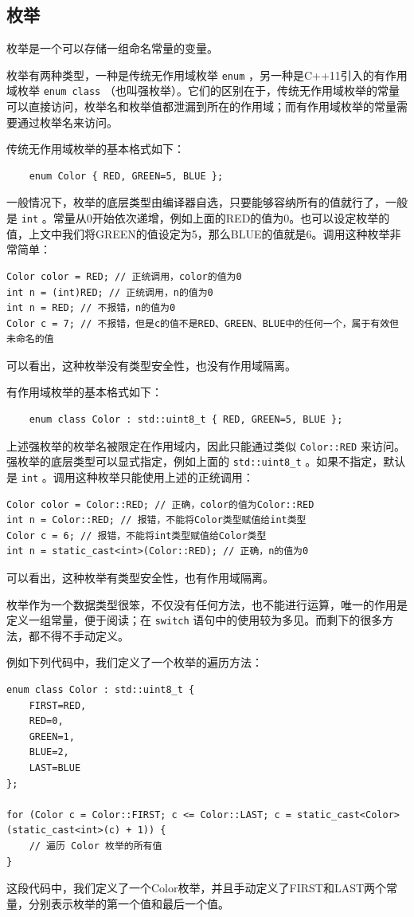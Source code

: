 \subsection{枚举}

枚举是一个可以存储一组命名常量的变量。

枚举有两种类型，一种是传统无作用域枚举 \texttt{enum} ，另一种是C++11引入的有作用域枚举 \texttt{enum class} （也叫强枚举）。它们的区别在于，传统无作用域枚举的常量可以直接访问，枚举名和枚举值都泄漏到所在的作用域；而有作用域枚举的常量需要通过枚举名来访问。

传统无作用域枚举的基本格式如下：
\begin{verbatim}
    enum Color { RED, GREEN=5, BLUE };
\end{verbatim}
一般情况下，枚举的底层类型由编译器自选，只要能够容纳所有的值就行了，一般是 \texttt{int} 。常量从0开始依次递增，例如上面的RED的值为0。也可以设定枚举的值，上文中我们将GREEN的值设定为5，那么BLUE的值就是6。调用这种枚举非常简单：
\begin{verbatim}
Color color = RED; // 正统调用，color的值为0
int n = (int)RED; // 正统调用，n的值为0
int n = RED; // 不报错，n的值为0
Color c = 7; // 不报错，但是c的值不是RED、GREEN、BLUE中的任何一个，属于有效但未命名的值
\end{verbatim}
可以看出，这种枚举没有类型安全性，也没有作用域隔离。

有作用域枚举的基本格式如下：
\begin{verbatim}
    enum class Color : std::uint8_t { RED, GREEN=5, BLUE };
\end{verbatim}
上述强枚举的枚举名被限定在作用域内，因此只能通过类似 \texttt{Color::RED} 来访问。强枚举的底层类型可以显式指定，例如上面的 \texttt{std::uint8\_t} 。如果不指定，默认是 \texttt{int} 。调用这种枚举只能使用上述的正统调用：
\begin{verbatim}
Color color = Color::RED; // 正确，color的值为Color::RED
int n = Color::RED; // 报错，不能将Color类型赋值给int类型
Color c = 6; // 报错，不能将int类型赋值给Color类型
int n = static_cast<int>(Color::RED); // 正确，n的值为0
\end{verbatim}
可以看出，这种枚举有类型安全性，也有作用域隔离。

枚举作为一个数据类型很笨，不仅没有任何方法，也不能进行运算，唯一的作用是定义一组常量，便于阅读；在 \texttt{switch} 语句中的使用较为多见。而剩下的很多方法，都不得不手动定义。

例如下列代码中，我们定义了一个枚举的遍历方法：
\begin{verbatim}
enum class Color : std::uint8_t {
    FIRST=RED,
    RED=0,
    GREEN=1,
    BLUE=2,
    LAST=BLUE
};

for (Color c = Color::FIRST; c <= Color::LAST; c = static_cast<Color>(static_cast<int>(c) + 1)) {
    // 遍历 Color 枚举的所有值
}
\end{verbatim}
这段代码中，我们定义了一个Color枚举，并且手动定义了FIRST和LAST两个常量，分别表示枚举的第一个值和最后一个值。

